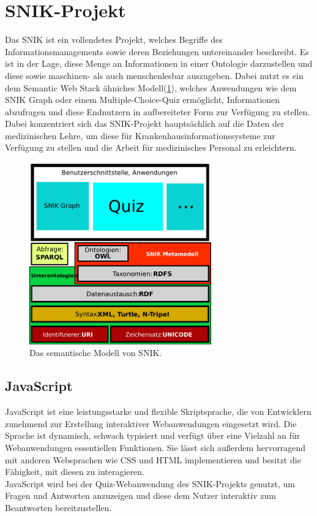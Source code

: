 \documentclass[headsepline,titlepage,ngerman,twoside,12pt]{report}
\begin{document}
\section{\acs{SNIK}-Projekt}
\label{sek:snik}
Das \ac{SNIK} ist ein vollendetes Projekt, welches Begriffe des Informationsmanagements sowie deren Beziehungen untereinander beschreibt.
Es ist in der Lage, diese Menge an Informationen in einer Ontologie darzustellen und diese sowie maschinen- als auch menschenlesbar auszugeben.
 Dabei nutzt es ein dem Semantic Web Stack ähniches Modell(\cref{img:semanticwebstack2}), welches Anwendungen wie dem \ac{SNIK} Graph oder einem Multiple-Choice-Quiz ermöglicht, Informationen abzufragen und diese Endnutzern in aufbereiteter Form zur Verfügung zu stellen.
Dabei konzentriert sich das SNIK-Projekt hauptsächlich auf die Daten der medizinischen Lehre, um diese für Krankenhausinformationssysteme zur Verfügung zu stellen und die Arbeit für medizinisches Personal zu erleichtern.
\begin{figure}
\centering
\includegraphics[width=0.7\textwidth]{images/swebstackde_snik.pdf}
\caption{Das semantische Modell von SNIK.}
\label{img:semanticwebstack2}
\end{figure}

\subsection{JavaScript}
\label{sub:js}
JavaScript ist eine leistungsstarke und flexible Skriptsprache, die von Entwicklern zunehmend zur Erstellung interaktiver Webanwendungen eingesetzt wird.
Die Sprache ist dynamisch, schwach typisiert und verfügt über eine Vielzahl an für Webanwendungen essentiellen Funktionen.
Sie lässt sich außerdem hervorragend mit anderen Websprachen wie CSS und HTML implementieren und besitzt die Fähigkeit, mit diesen zu interagieren.\\
JavaScript wird bei der Quiz-Webanwendung des SNIK-Projekts genutzt, um Fragen und Antworten anzuzeigen und diese dem Nutzer interaktiv zum Beantworten bereitzustellen.
\end{document}
